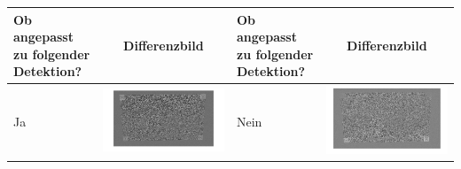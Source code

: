 \begin{table}[htb]
	\label{tbl:differenzbildformel}
	\footnotesize
	\centering
	\begin{tabular}{|p{2cm}<{\centering}|c|p{2cm}<{\centering}|c|}	%
	\toprule
	\textbf{Ob angepasst zu folgender Detektion?} & \multirow{4}{*}{\textbf{Differenzbild}} & \textbf{Ob angepasst zu folgender Detektion?} & \multirow{4}{*}{\textbf{Differenzbild}} \\
	\midrule
	 Ja & \includegraphics[scale=0.12]{images/3_Ersteverfahren/Differenzbild/0schwarz.pdf}& Nein & \includegraphics[scale=0.15]{images/3_Ersteverfahren/Differenzbild/1halfschwarz.pdf}\\

\end{tabular}
\end{table}
